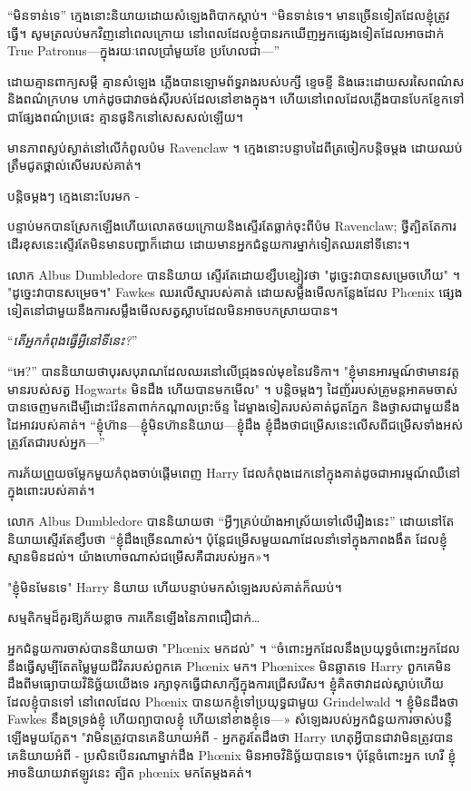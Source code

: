 {{“មិនទាន់ទេ” ក្មេងនោះនិយាយដោយសំឡេងពិបាកស្តាប់។ “មិនទាន់ទេ។ មាន​ច្រើន​ទៀត​ដែល​ខ្ញុំ​ត្រូវ​ធ្វើ។ សូមត្រលប់មកវិញនៅពេលក្រោយ នៅពេលដែលខ្ញុំបានរកឃើញអ្នកផ្សេងទៀតដែលអាចដាក់ True Patronus—ក្នុងរយៈពេលប្រាំមួយខែ ប្រហែលជា—”

ដោយគ្មានពាក្យសម្ដី គ្មានសំឡេង ភ្លើងបានឡោមព័ទ្ធរាងរបស់បក្សី ខ្ទេចខ្ទី និងឆេះដោយសរសៃពណ៌ស និងពណ៌ក្រហម ហាក់ដូចជាវាចង់ស៊ីរបស់ដែលនៅខាងក្នុង។ ហើយនៅពេលដែលភ្លើងបានបែកខ្ញែកទៅជាផ្សែងពណ៌ប្រផេះ គ្មានផូនិកនៅសេសសល់ឡើយ។

មានភាពស្ងប់ស្ងាត់នៅលើកំពូលប៉ម Ravenclaw ។ ក្មេង​នោះ​បន្ទាប​ដៃ​ពី​ត្រចៀក​បន្តិច​ម្តង ដោយ​ឈប់​ត្រឹម​ជូត​ថ្ពាល់​សើម​របស់​គាត់។

បន្តិចម្ដងៗ ក្មេងនោះបែរមក -

បន្ទាប់​មក​បាន​ស្រែក​ឡើង​ហើយ​លោត​ថយ​ក្រោយ​និង​ស្ទើរ​តែ​ធ្លាក់​ចុះ​ពី​ប៉ម Ravenclaw; ថ្វីត្បិតតែការដើរខុសនេះស្ទើរតែមិនមានបញ្ហាក៏ដោយ ដោយមានអ្នកជំនួយការម្នាក់ទៀតឈរនៅទីនោះ។

លោក Albus Dumbledore បាននិយាយ ស្ទើរតែដោយខ្សឹបខ្សៀវថា "ដូច្នេះវាបានសម្រេចហើយ" ។ "ដូច្នេះវាបានសម្រេច។" Fawkes ឈរលើស្មារបស់គាត់ ដោយសម្លឹងមើលកន្លែងដែល Phœnix ផ្សេងទៀតនៅជាមួយនឹងការសម្លឹងមើលសត្វស្លាបដែលមិនអាចបកស្រាយបាន។

“\emph{តើអ្នកកំពុងធ្វើអ្វីនៅទីនេះ?}”

“អេ?” បាននិយាយថាបុរសបុរាណដែលឈរនៅលើជ្រុងទល់មុខនៃវេទិកា។ "ខ្ញុំមានអារម្មណ៍ថាមានវត្តមានរបស់សត្វ Hogwarts មិនដឹង ហើយបានមកមើល" ។ បន្តិចម្ដងៗ ដៃញ័ររបស់គ្រូមន្តអាគមចាស់បានចេញមកដើម្បីដោះវ៉ែនតាពាក់កណ្តាលព្រះច័ន្ទ ដៃម្ខាងទៀតរបស់គាត់ជូតភ្នែក និងថ្ងាសជាមួយនឹងដៃអាវរបស់គាត់។ “ខ្ញុំហ៊ាន—ខ្ញុំមិនហ៊ាននិយាយ—ខ្ញុំដឹង ខ្ញុំដឹងថាជម្រើសនេះលើសពីជម្រើសទាំងអស់ត្រូវតែជារបស់អ្នក—”

ការភ័យព្រួយចម្លែកមួយកំពុងចាប់ផ្តើមពេញ Harry ដែលកំពុងដេកនៅក្នុងគាត់ដូចជាអារម្មណ៍ឈឺនៅក្នុងពោះរបស់គាត់។

លោក Albus Dumbledore បាននិយាយថា “អ្វីៗគ្រប់យ៉ាងអាស្រ័យទៅលើរឿងនេះ” ដោយនៅតែនិយាយស្ទើរតែខ្សឹបថា “ខ្ញុំដឹងច្រើនណាស់។ ប៉ុន្តែ​ជម្រើស​មួយ​ណា​ដែល​នាំ​ទៅ​ក្នុង​ភាព​ងងឹត ដែល​ខ្ញុំ​ស្មាន​មិន​ដល់។ យ៉ាង​ហោច​ណាស់​ជម្រើស​គឺ​ជា​របស់​អ្នក»។

"ខ្ញុំមិនមែនទេ" Harry និយាយ ហើយបន្ទាប់មកសំឡេងរបស់គាត់ក៏ឈប់។

សម្មតិកម្មដ៏គួរឱ្យភ័យខ្លាច ការកើនឡើងនៃភាពជឿជាក់…

អ្នកជំនួយការចាស់បាននិយាយថា "Phœnix មកដល់" ។ “ចំពោះ​អ្នក​ដែល​នឹង​ប្រយុទ្ធ ​ចំពោះ​អ្នក​ដែល​នឹង​ធ្វើ​សូម្បី​តែ​តម្លៃ​មួយ​ជីវិត​របស់​ពួក​គេ Phœnix មក។ Phœnixes មិនឆ្លាតទេ Harry ពួកគេមិនដឹងពីមធ្យោបាយវិនិច្ឆ័យយើងទេ រក្សាទុកធ្វើជាសាក្សីក្នុងការជ្រើសរើស។ ខ្ញុំ​គិត​ថា​វា​ដល់​ស្លាប់​ហើយ​ដែល​ខ្ញុំ​បាន​ទៅ នៅ​ពេល​ដែល Phœnix បាន​យក​ខ្ញុំ​ទៅ​ប្រយុទ្ធ​ជាមួយ Grindelwald ។ ខ្ញុំមិនដឹងថា Fawkes នឹងទ្រទ្រង់ខ្ញុំ ហើយព្យាបាលខ្ញុំ ហើយនៅខាងខ្ញុំទេ—» សំឡេងរបស់អ្នកជំនួយការចាស់បន្លឺឡើងមួយភ្លែត។ "វាមិនត្រូវបានគេនិយាយអំពី - អ្នកគួរតែដឹងថា Harry ហេតុអ្វីបានជាវាមិនត្រូវបានគេនិយាយអំពី - ប្រសិនបើនរណាម្នាក់ដឹង Phœnix មិនអាចវិនិច្ឆ័យបានទេ។ ប៉ុន្តែចំពោះអ្នក ហេរី ខ្ញុំអាចនិយាយវាឥឡូវនេះ ត្បិត phœnix មកតែម្តងគត់។

}}

